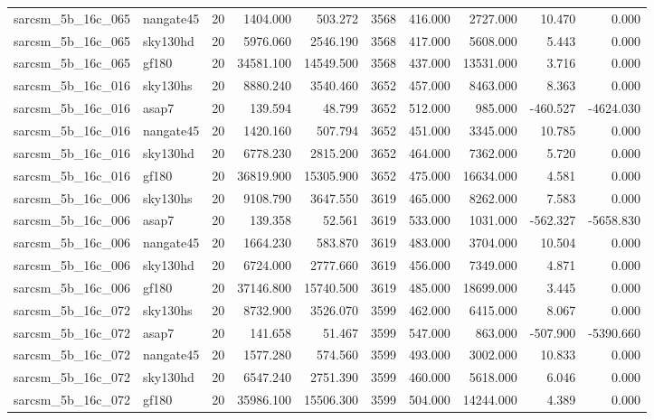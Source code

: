 \documentclass{article}
\begin{document}
\begin{longtable}{llrrrrrrrr}
sarcsm\_5b\_16c\_065 & nangate45 & 20 & 1404.000 & 503.272 & 3568 & 416.000 & 2727.000 & 10.470 & 0.000 \\
sarcsm\_5b\_16c\_065 & sky130hd & 20 & 5976.060 & 2546.190 & 3568 & 417.000 & 5608.000 & 5.443 & 0.000 \\
sarcsm\_5b\_16c\_065 & gf180 & 20 & 34581.100 & 14549.500 & 3568 & 437.000 & 13531.000 & 3.716 & 0.000 \\
sarcsm\_5b\_16c\_016 & sky130hs & 20 & 8880.240 & 3540.460 & 3652 & 457.000 & 8463.000 & 8.363 & 0.000 \\
sarcsm\_5b\_16c\_016 & asap7 & 20 & 139.594 & 48.799 & 3652 & 512.000 & 985.000 & -460.527 & -4624.030 \\
sarcsm\_5b\_16c\_016 & nangate45 & 20 & 1420.160 & 507.794 & 3652 & 451.000 & 3345.000 & 10.785 & 0.000 \\
sarcsm\_5b\_16c\_016 & sky130hd & 20 & 6778.230 & 2815.200 & 3652 & 464.000 & 7362.000 & 5.720 & 0.000 \\
sarcsm\_5b\_16c\_016 & gf180 & 20 & 36819.900 & 15305.900 & 3652 & 475.000 & 16634.000 & 4.581 & 0.000 \\
sarcsm\_5b\_16c\_006 & sky130hs & 20 & 9108.790 & 3647.550 & 3619 & 465.000 & 8262.000 & 7.583 & 0.000 \\
sarcsm\_5b\_16c\_006 & asap7 & 20 & 139.358 & 52.561 & 3619 & 533.000 & 1031.000 & -562.327 & -5658.830 \\
sarcsm\_5b\_16c\_006 & nangate45 & 20 & 1664.230 & 583.870 & 3619 & 483.000 & 3704.000 & 10.504 & 0.000 \\
sarcsm\_5b\_16c\_006 & sky130hd & 20 & 6724.000 & 2777.660 & 3619 & 456.000 & 7349.000 & 4.871 & 0.000 \\
sarcsm\_5b\_16c\_006 & gf180 & 20 & 37146.800 & 15740.500 & 3619 & 485.000 & 18699.000 & 3.445 & 0.000 \\
sarcsm\_5b\_16c\_072 & sky130hs & 20 & 8732.900 & 3526.070 & 3599 & 462.000 & 6415.000 & 8.067 & 0.000 \\
sarcsm\_5b\_16c\_072 & asap7 & 20 & 141.658 & 51.467 & 3599 & 547.000 & 863.000 & -507.900 & -5390.660 \\
sarcsm\_5b\_16c\_072 & nangate45 & 20 & 1577.280 & 574.560 & 3599 & 493.000 & 3002.000 & 10.833 & 0.000 \\
sarcsm\_5b\_16c\_072 & sky130hd & 20 & 6547.240 & 2751.390 & 3599 & 460.000 & 5618.000 & 6.046 & 0.000 \\
sarcsm\_5b\_16c\_072 & gf180 & 20 & 35986.100 & 15506.300 & 3599 & 504.000 & 14244.000 & 4.389 & 0.000 \\

\end{longtable}
\end{document}
